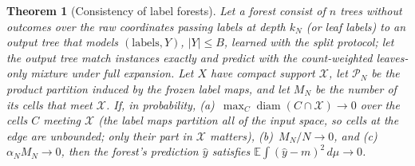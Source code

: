 \documentclass[11pt]{article}
\newtheorem{theorem}{Theorem}
\theoremstyle{definition}
\theoremstyle{remark}
\newcommand{\E}{\mathbb{E}}
\newcommand{\hy}{\hat{y}}
\newcommand{\diam}{\operatorname{diam}}
\begin{document}
\begin{theorem}[Consistency of label forests]\label{thm:labelcons}
Let a forest consist of $n$ trees without outcomes over the raw coordinates passing labels
at depth $k_N$ (or leaf labels) to an output tree that models $(\text{labels},Y)$, $|Y|\le B$,
learned with the split protocol; let the output tree match instances exactly and
predict with the count-weighted leaves-only mixture under full expansion.  Let $X$ have
compact support $\mathcal X$, let $\mathcal P_N$ be the product partition induced by the
frozen label maps, and let $M_N$ be the number of its cells that meet $\mathcal X$.  If,
in probability, (a)~$\max_C\diam(C\cap\mathcal X)\to0$ over the cells $C$ meeting $\mathcal X$ (the label
maps partition all of the input space, so cells at the edge are unbounded; only their part
in $\mathcal X$ matters),
(b)~$M_N/N\to0$, and (c)~$\alpha_NM_N\to0$, then the forest's prediction $\hy$ satisfies
$\E\int(\hy-m)^2\,d\mu\to0$.
\end{theorem}
\end{document}
